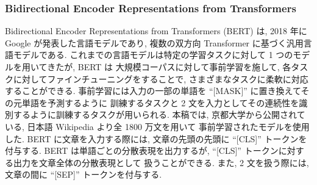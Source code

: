 \changeindent{0cm}
\subsubsection{Bidirectional Encoder Representations from Transformers}
\changeindent{2cm}
Bidirectional Encoder Representations from Transformers (BERT) \cite{devlin2018bert} は, 2018 年に
Google が発表した言語モデルであり, 複数の双方向 Transformer に基づく汎用言語モデルである.
これまでの言語モデルは特定の学習タスクに対して 1 つのモデルを用いてきたが, BERT は
大規模コーパスに対して事前学習を施して, 各タスクに対してファインチューニングをすることで,
さまざまなタスクに柔軟に対応することができる.
事前学習には入力の一部の単語を “[MASK]” に置き換えてその元単語を予測するように
訓練するタスクと 2 文を入力としてその連続性を識別するように訓練するタスクが用いられる.
本稿では, 京都大学から公開されている, 日本語 Wikipedia より全 1800 万文を用いて
事前学習されたモデルを使用した.
BERT に文章を入力する際には, 文章の先頭の先頭に “[CLS]” トークンを付与する.
BERT は単語ごとの分散表現を出力するが, “[CLS]” トークンに対する出力を文章全体の分散表現として
扱うことができる. また, 2 文を扱う際には, 文章の間に “[SEP]” トークンを付与する.
